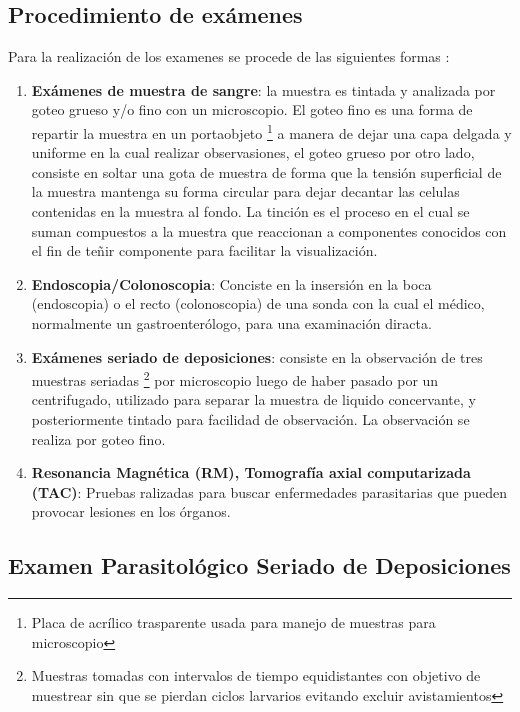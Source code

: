 \documentclass[letter,12pt]{report}
\begin{document}
\subsection{Procedimiento de exámenes}

Para la realización de los examenes se procede de las siguientes formas \cite{c01}:

\begin{enumerate}
    \item \textbf{Exámenes de muestra de sangre}: la muestra es tintada y analizada por
        goteo grueso y/o fino con un microscopio. El goteo fino es una forma de repartir
        la muestra en un portaobjeto \footnote{Placa de acrílico trasparente usada para
        manejo de muestras para microscopio} a manera de dejar una capa delgada y
        uniforme en la cual realizar observasiones, el goteo grueso por otro lado,
        consiste en soltar una gota de muestra de forma que la tensión superficial de la
        muestra mantenga su forma circular para dejar decantar las celulas contenidas en
        la muestra al fondo.  La tinción es el proceso en el cual se suman compuestos a
        la muestra que reaccionan a componentes conocidos con el fin de teñir componente
        para facilitar la visualización.
    \item \textbf{Endoscopia/Colonoscopia}: Conciste en la insersión en la boca
        (endoscopia) o el recto (colonoscopia) de una sonda con la cual el médico,
        normalmente un gastroenterólogo, para una examinación diracta.
    \item \textbf{Exámenes seriado de deposiciones}: consiste en la observación de tres
        muestras seriadas \footnote{Muestras tomadas con intervalos de tiempo
        equidistantes con objetivo de muestrear sin que se pierdan ciclos larvarios
        evitando excluir avistamientos} por microscopio luego de haber pasado por
        un centrifugado, utilizado para separar la muestra de liquido concervante, y
        posteriormente tintado para facilidad de observación. La observación se realiza por
        goteo fino.
    \item \textbf{Resonancia Magnética (RM), Tomografía axial computarizada (TAC)}:
        Pruebas ralizadas para buscar enfermedades parasitarias que pueden provocar
        lesiones en los órganos.
\end{enumerate}

\subsection{Examen Parasitológico Seriado de Deposiciones}
\blindtext
\end{document}
